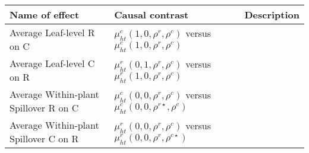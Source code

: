 \documentclass[]{article}
\begin{document}
\begin{longtable}[]{@{}lll@{}}
\toprule
\begin{minipage}[b]{0.26\columnwidth}\raggedright
Name of effect\strut
\end{minipage} & \begin{minipage}[b]{0.31\columnwidth}\raggedright
Causal contrast\strut
\end{minipage} & \begin{minipage}[b]{0.34\columnwidth}\raggedright
Description\strut
\end{minipage}\tabularnewline
\midrule
\endhead
\begin{minipage}[t]{0.26\columnwidth}\raggedright
Average Leaf-level R on C\strut
\end{minipage} & \begin{minipage}[t]{0.31\columnwidth}\raggedright
\(\mu^c_{ht}(1, 0, \rho^r, \rho^c)\) versus
\(\mu^c_{ht}(1, 0, \rho^r, \rho^c)\)\strut
\end{minipage} & \begin{minipage}[t]{0.34\columnwidth}\raggedright
\strut
\end{minipage}\tabularnewline
\begin{minipage}[t]{0.26\columnwidth}\raggedright
Average Leaf-level C on R\strut
\end{minipage} & \begin{minipage}[t]{0.31\columnwidth}\raggedright
\(\mu^r_{ht}(0, 1, \rho^r, \rho^c)\) versus
\(\mu^r_{ht}(1, 0, \rho^r, \rho^c)\)\strut
\end{minipage} & \begin{minipage}[t]{0.34\columnwidth}\raggedright
\strut
\end{minipage}\tabularnewline
\begin{minipage}[t]{0.26\columnwidth}\raggedright
Average Within-plant Spillover R on C\strut
\end{minipage} & \begin{minipage}[t]{0.31\columnwidth}\raggedright
\(\mu^c_{ht}(0, 0, \rho^r, \rho^c)\) versus
\(\mu^c_{ht}(0, 0, \rho^{r\star}, \rho^c)\)\strut
\end{minipage} & \begin{minipage}[t]{0.34\columnwidth}\raggedright
\strut
\end{minipage}\tabularnewline
\begin{minipage}[t]{0.26\columnwidth}\raggedright
Average Within-plant Spillover C on R\strut
\end{minipage} & \begin{minipage}[t]{0.31\columnwidth}\raggedright
\(\mu^r_{ht}(0, 0, \rho^r, \rho^c)\) versus
\(\mu^r_{ht}(0, 0, \rho^{r}, \rho^{c\star})\)\strut
\end{minipage} & \begin{minipage}[t]{0.34\columnwidth}\raggedright
\strut
\end{minipage}\tabularnewline
\bottomrule
\end{longtable}
\end{document}

